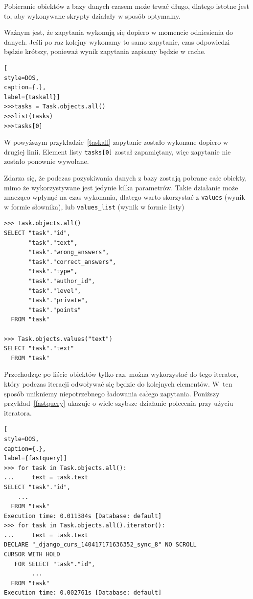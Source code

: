 \documentclass[oneside,polski,logo,indent]{amuthesis}
\begin{document}
Pobieranie obiektów z bazy danych czasem może trwać długo, dlatego istotne jest to, aby wykonywane skrypty działały w sposób optymalny. 

Ważnym jest, że zapytania wykonują się dopiero w momencie odniesienia do danych. Jeśli po raz kolejny wykonamy to samo zapytanie, czas odpowiedzi będzie krótszy, ponieważ wynik zapytania zapisany będzie w cache.
\begin{lstlisting}[
style=DOS,
caption={.},
label={taskall}]
>>>tasks = Task.objects.all()
>>>list(tasks)
>>>tasks[0]
\end{lstlisting}
W powyższym przykładzie~\ref{taskall} zapytanie zostało wykonane dopiero w drugiej linii. Element listy \texttt{tasks[0]} został zapamiętany, więc zapytanie nie zostało ponownie wywołane.

Zdarza się, że podczas pozyskiwania danych z bazy zostają pobrane całe obiekty, mimo że wykorzystywane jest jedynie kilka parametrów. Takie działanie może znacząco wpłynąć na czas wykonania, dlatego warto skorzystać z \texttt{values} (wynik w formie słownika), lub \texttt{values\_list} (wynik w formie listy)
\begin{lstlisting}[style=DOS]
>>> Task.objects.all()
SELECT "task"."id",
       "task"."text",
       "task"."wrong_answers",
       "task"."correct_answers",
       "task"."type",
       "task"."author_id",
       "task"."level",
       "task"."private",
       "task"."points"
  FROM "task"

>>> Task.objects.values("text")
SELECT "task"."text"
  FROM "task"
\end{lstlisting}
Przechodząc po liście obiektów tylko raz, można wykorzystać do tego iterator, który podczas iteracji odwoływać się będzie do kolejnych elementów. W~ten sposób unikniemy niepotrzebnego ładowania całego zapytania. Poniższy przykład~\ref{fastquery} ukazuje o wiele szybsze działanie polecenia przy użyciu iteratora.
\begin{lstlisting}[
style=DOS,
caption={.},
label={fastquery}]
>>> for task in Task.objects.all():
...     text = task.text
SELECT "task"."id",
	...
  FROM "task"
Execution time: 0.011384s [Database: default]
>>> for task in Task.objects.all().iterator():
...     text = task.text
DECLARE "_django_curs_140417171636352_sync_8" NO SCROLL
CURSOR WITH HOLD
   FOR SELECT "task"."id",
		...
  FROM "task"
Execution time: 0.002761s [Database: default]
\end{lstlisting}
\end{document}
